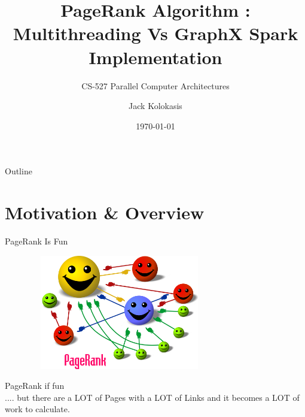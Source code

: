 \documentclass{beamer}
\title{PageRank Algorithm : Multithreading Vs GraphX Spark Implementation}
\subtitle{CS-527 Parallel Computer Architectures}
\author{Jack Kolokasis}
\institute[kolokasis@csd.forth.gr] %
\date{\today}
\begin{document}
\begin{frame}
  \titlepage
\end{frame}

\begin{frame}{Outline}
    \tableofcontents
\end{frame}

\section{Motivation \& Overview}

\begin{frame}{PageRank Is Fun}
    \begin{figure}
        \includegraphics[width=8cm, height=5cm]{figure1.png}
    \end{figure}

    \begin{itemize}
            PageRank if fun \\
            .... but there are a LOT of Pages with a LOT of Links
            and it becomes a LOT of work to calculate.
    \end{itemize}

\end{frame}
\end{document}
